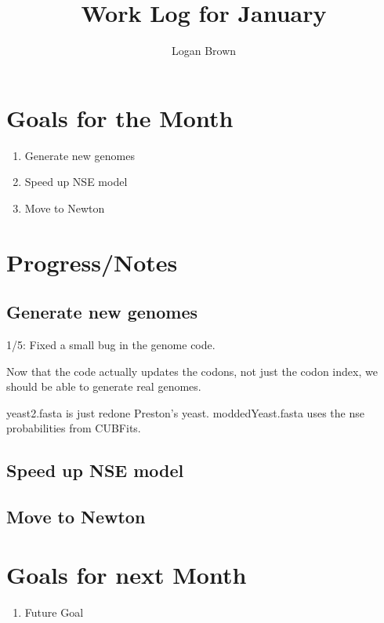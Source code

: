 

\title{Work Log for January}
\author{Logan Brown}


\maketitle
\tableofcontents

\newpage


\section{Goals for the Month}
\begin{enumerate}
\item Generate new genomes
\item Speed up NSE model
\item Move to Newton

\end{enumerate}

\section{Progress/Notes}

\subsection{Generate new genomes}

1/5: Fixed a small bug in the genome code.

Now that the code actually updates the codons, not just the codon index, we should be able to generate real genomes.

yeast2.fasta is just redone Preston's yeast. moddedYeast.fasta uses the nse probabilities from CUBFits.


\subsection{Speed up NSE model}

\subsection{Move to Newton}





\section{Goals for next Month}
\begin{enumerate}
\item Future Goal
\end{enumerate}


